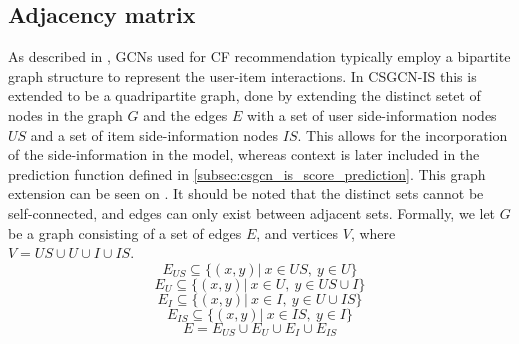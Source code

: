\subsection{Adjacency matrix}\label{subsec:csgcn_is_adj_mat}
As described in , GCNs used for CF recommendation typically employ a bipartite graph structure to represent the user-item interactions.
In CSGCN-IS this is extended to be a quadripartite graph, done by extending the distinct setet of nodes in the graph $G$ and the edges $E$ with a set of user side-information nodes $US$ and a set of item side-information nodes $IS$.
This allows for the incorporation of the side-information in the model, whereas context is later included in the prediction function defined in \autoref{subsec:csgcn_is_score_prediction}.
This graph extension can be seen on .
It should be noted that the distinct sets cannot be self-connected, and edges can only exist between adjacent sets.
Formally, we let $G$ be a graph consisting of a set of edges $E$, and vertices $V$, where $V = US \cup U \cup I \cup IS$.
$$E_{US} \subseteq \{ (x,y) | \: x \in US, \: y \in U  \}$$
$$E_U \subseteq \{ (x,y) | \: x \in U, \: y \in US \cup I \}$$
$$E_I \subseteq \{ (x,y) | \: x \in I, \: y \in U \cup IS \}$$
$$E_{IS} \subseteq \{ (x,y) | \: x \in IS, \: y \in I  \}$$
$$E = E_{US} \cup E_{U} \cup E_{I} \cup E_{IS} $$

